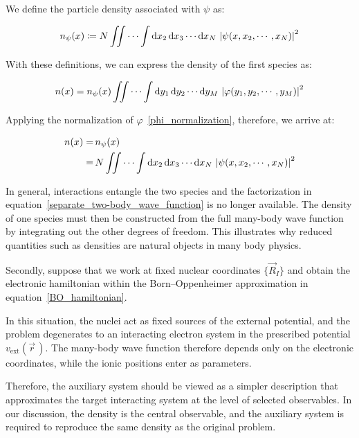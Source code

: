We define the particle density associated with $\psi$ as:

\begin{equation}
    n_\psi(x)\coloneqq N\iint\cdots\int\mathrm{d}{x_2}\,\mathrm{d}{x_3}\cdots\mathrm{d}{x_N}\,\left|\psi(x,x_2,\cdots,x_N)\right|^2
\label{density_first_species_psi}
\end{equation}

With these definitions, we can express the density of the first species as:

\begin{equation}
    n(x)=n_\psi(x)\iint\cdots\int\mathrm{d}{y_1}\,\mathrm{d}{y_2}\cdots\mathrm{d}{y_M}\,\left|\varphi(y_1,y_2,\cdots,y_M)\right|^2
\label{two_body_density_factorized}
\end{equation}

Applying the normalization of $\varphi$~\eqref{phi_normalization},
therefore, we arrive at:

\begin{equation}
\begin{aligned}
    n(x)
    =& \,n_\psi(x) \\
    =& \,N\iint\cdots\int\mathrm{d}{x_2}\,\mathrm{d}{x_3}\cdots\mathrm{d}{x_N}\,\left|\psi(x,x_2,\cdots,x_N)\right|^2
\end{aligned}
\label{one_body_density_from_many_body_wave_function}
\end{equation}

In general, interactions entangle the two species and the factorization in equation~\eqref{separate_two-body_wave_function} is no longer available.
The density of one species must then be constructed from the full many-body wave function by integrating out the other degrees of freedom.
This illustrates why reduced quantities such as densities are natural objects in many body physics.

Secondly, suppose that we work at fixed nuclear coordinates $\{\vec{R}_I\}$ and obtain the electronic hamiltonian within the Born--Oppenheimer approximation in equation~\eqref{BO_hamiltonian}.

In this situation, the nuclei act as fixed sources of the external potential, and the problem degenerates to an interacting electron system in the prescribed potential $v_\mathrm{ext}(\vec{r}\,)$.
The many-body wave function therefore depends only on the electronic coordinates, while the ionic positions enter as parameters.

Therefore, the auxiliary system should be viewed as a simpler description that approximates the target interacting system at the level of selected observables.
In our discussion, the density is the central observable, and the auxiliary system is required to reproduce the same density as the original problem.

